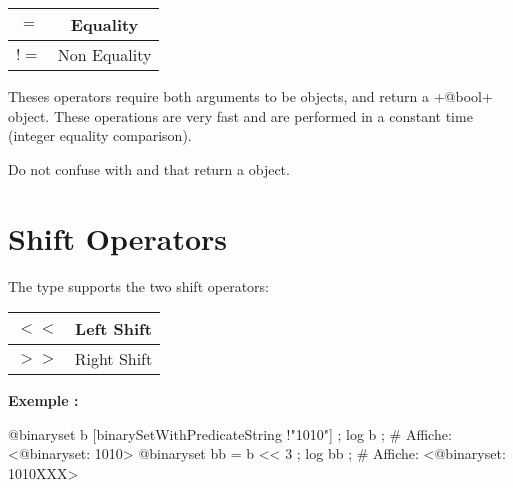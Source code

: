 \begin{tabular}{|c|c|}
\hline
$=$ & Equality \\
\hline
$!=$ & Non Equality \\
\hline
\end{tabular}

Theses operators require both arguments to be  objects, and return a \ggs+@bool+ object. These operations are very fast and are performed in a constant time (integer equality comparison).

Do not confuse with  and  that return a  object.







\section{Shift Operators}

The  type supports the two shift operators:\newline

\begin{tabular}{|c|c|}
\hline
$<<$ & Left Shift \\
\hline
$>>$ & Right Shift \\
\hline
\end{tabular}

\textbf{Exemple :}
\begin{galgascode}
@binaryset b [binarySetWithPredicateString !"1010"] ;
log b ; # Affiche: <@binaryset: 1010>
@binaryset bb = b << 3 ;
log bb ; # Affiche: <@binaryset: 1010XXX>
\end{galgascode}

